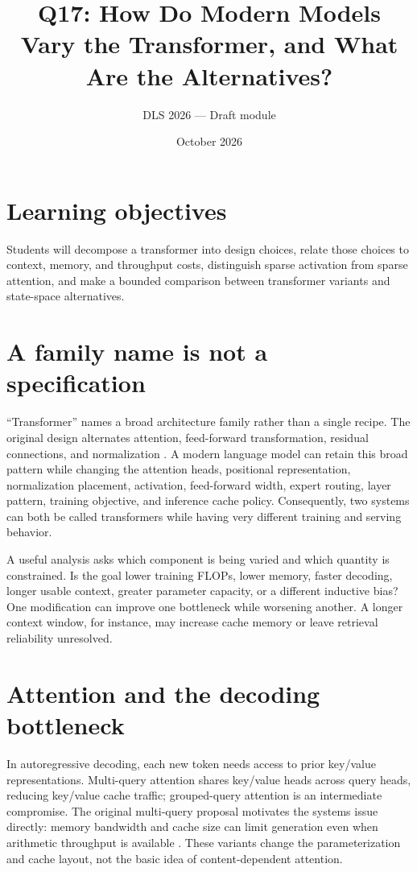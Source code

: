 \documentclass[11pt]{article}
\title{Q17: How Do Modern Models Vary the Transformer, and What Are the Alternatives?}
\author{DLS 2026 --- Draft module}\date{October 2026}
\begin{document}
\maketitle
\section*{Learning objectives}
Students will decompose a transformer into design choices, relate those choices to context, memory, and throughput costs, distinguish sparse activation from sparse attention, and make a bounded comparison between transformer variants and state-space alternatives.

\section{A family name is not a specification}
``Transformer'' names a broad architecture family rather than a single recipe. The original design alternates attention, feed-forward transformation, residual connections, and normalization \cite{vaswani2017attention}. A modern language model can retain this broad pattern while changing the attention heads, positional representation, normalization placement, activation, feed-forward width, expert routing, layer pattern, training objective, and inference cache policy. Consequently, two systems can both be called transformers while having very different training and serving behavior.

A useful analysis asks which component is being varied and which quantity is constrained. Is the goal lower training FLOPs, lower memory, faster decoding, longer usable context, greater parameter capacity, or a different inductive bias? One modification can improve one bottleneck while worsening another. A longer context window, for instance, may increase cache memory or leave retrieval reliability unresolved.

\section{Attention and the decoding bottleneck}
In autoregressive decoding, each new token needs access to prior key/value representations. Multi-query attention shares key/value heads across query heads, reducing key/value cache traffic; grouped-query attention is an intermediate compromise. The original multi-query proposal motivates the systems issue directly: memory bandwidth and cache size can limit generation even when arithmetic throughput is available \cite{shazeer2019fast}. These variants change the parameterization and cache layout, not the basic idea of content-dependent attention.
\end{document}
